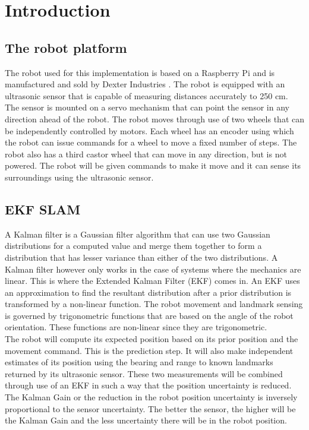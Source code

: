 \documentclass[conference]{IEEEtran}
\begin{document}
\section{Introduction}
\subsection{The robot platform}
The robot used for this implementation is based on a Raspberry Pi and is manufactured and sold by Dexter Industries \cite{dexter}. The robot is equipped with an ultrasonic sensor that is capable of measuring distances accurately to 250 cm. The sensor is mounted on a servo mechanism that can point the sensor in any direction ahead of the robot. The robot moves through use of two wheels that can be independently controlled by motors. Each wheel has an encoder using which the robot can issue commands for a wheel to move a fixed number of steps. The robot also has a third castor wheel that can move in any direction, but is not powered. The robot will be given commands to make it move and it can sense its surroundings using the ultrasonic sensor.
\subsection{EKF SLAM}
A Kalman filter is a Gaussian filter algorithm that can use two Gaussian distributions for a computed value and merge them together to form a distribution that has lesser variance than either of the two distributions. A Kalman filter however only works in the case of systems where the mechanics are linear. This is where the Extended Kalman Filter (EKF) comes in. An EKF uses an approximation to find the resultant distribution after a prior distribution is transformed by a non-linear function. The robot movement and landmark sensing is governed by trigonometric functions that are based on the angle of the robot orientation. These functions are non-linear since they are trigonometric.\\

The robot will compute its expected position based on its prior position and the movement command. This is the prediction step. It will also make independent estimates of its position using the bearing and range to known landmarks returned by its ultrasonic sensor. These two measurements will be combined through use of an EKF in such a way that the position uncertainty is reduced. The Kalman Gain or the reduction in the robot position uncertainty is inversely proportional to the sensor uncertainty. The better the sensor, the higher will be the Kalman Gain and the less uncertainty there will be in the robot position\cite{stachniss}.
\end{document}
